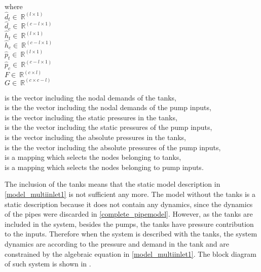   \begin{minipage}[t]{0.20\textwidth}
where\\
\hspace*{8mm} $\hat{d}_t \in \: \mathbb{R}^{(l \times 1)}$\\
\hspace*{8mm} $\hat{d}_c \in \: \mathbb{R}^{(\!c\!-\!l \times 1\!)}$ \\
\newline
\hspace*{8mm} $\hat{h}_t \in \: \mathbb{R}^{(l \times 1)}$\\
\hspace*{8mm} $\hat{h}_c \in \: \mathbb{R}^{(\!c\!-\!l \! \times \! 1\!)}$ \\
\newline
\hspace*{8mm} $\hat{p}_t \in \: \mathbb{R}^{(l \times 1)}$\\
\hspace*{8mm} $\hat{p}_c \in \: \mathbb{R}^{(\!c\!-\!l \times 1\!)}$ \\
\newline
\hspace*{8mm} $F \in \: \mathbb{R}^{(c \times l)}$ \\
\hspace*{8mm} $G \in \: \mathbb{R}^{(\!c \times c\!-\!l\!)}$
\end{minipage}
\begin{minipage}[t]{0.68\textwidth}
\vspace*{2mm}
is the vector including the nodal demands of the tanks,\\
is the the vector including the nodal demands of the pump inputs,\\
is the vector including the static pressures in the tanks,\\
is the the vector including the static pressures of the pump inputs,\\
is the vector including the absolute pressures in the tanks,\\
is the the vector including the absolute pressures of the pump inputs,\\
is a mapping which selects the nodes belonging to tanks, \\
is a mapping which selects the nodes belonging to pump inputs.
\end{minipage}

The inclusion of the tanks means that the static model description in \eqref{model_multiinlet1} is not sufficient any more. The model without the tanks is a static description because it does not contain any dynamics, since the dynamics of the pipes were discarded in \eqref{complete_pipemodel}. However, as the tanks are included in the system, besides the pumps, the tanks have pressure contribution to the inputs. Therefore when the system is described with the tanks, the system dynamics are according to the pressure and demand in the tank and are constrained by the algebraic equation in \eqref{model_multiinlet1}. The block diagram of such system is shown in .


